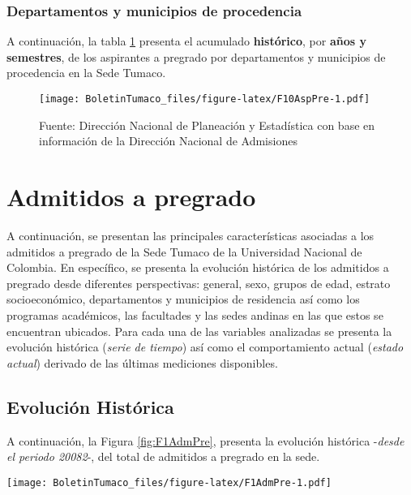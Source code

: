 \documentclass[
]{book}
\begin{document}
\hypertarget{departamentos-y-municipios-de-procedencia}{%
\subsubsection{Departamentos y municipios de procedencia}\label{departamentos-y-municipios-de-procedencia}}

A continuación, la tabla \ref{fig:F10AspPre} presenta el acumulado \textbf{histórico}, por \textbf{años y semestres}, de los aspirantes a pregrado por departamentos y municipios de procedencia en la Sede Tumaco.

\begin{figure}
\centering
\texttt{[image: BoletinTumaco\_files/figure-latex/F10AspPre-1.pdf]}
\caption{\label{fig:F10AspPre}Fuente: Dirección Nacional de Planeación y Estadística con base en información de la Dirección Nacional de Admisiones}
\end{figure}

\hypertarget{AdmPre}{%
\section{Admitidos a pregrado}\label{AdmPre}}

A continuación, se presentan las principales características asociadas a los admitidos a pregrado de la Sede Tumaco de la Universidad Nacional de Colombia. En específico, se presenta la evolución histórica de los admitidos a pregrado desde diferentes perspectivas: general, sexo, grupos de edad, estrato socioeconómico, departamentos y municipios de residencia así como los programas académicos, las facultades y las sedes andinas en las que estos se encuentran ubicados. Para cada una de las variables analizadas se presenta la evolución histórica (\emph{serie de tiempo}) así como el comportamiento actual (\emph{estado actual}) derivado de las últimas mediciones disponibles.

\hypertarget{evoluciuxf3n-histuxf3rica-1}{%
\subsection{Evolución Histórica}\label{evoluciuxf3n-histuxf3rica-1}}

A continuación, la Figura \ref{fig:F1AdmPre}, presenta la evolución histórica -\emph{desde el periodo 20082}-, del total de admitidos a pregrado en la sede.

\texttt{[image: BoletinTumaco\_files/figure-latex/F1AdmPre-1.pdf]}
\end{document}
